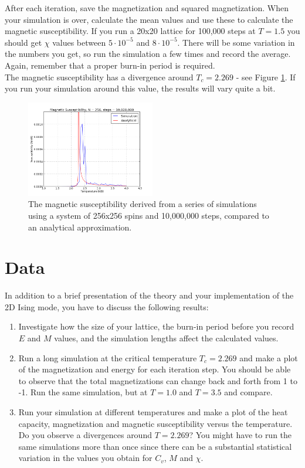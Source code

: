 \documentclass{article}
\begin{document}
After each iteration, save the magnetization and squared magnetization.
When your simulation is over, calculate the mean values and use these to calculate the magnetic susceptibility.
If you run a 20x20 lattice for 100,000 steps at $T = 1.5$ you should get $\chi$ values between $5 \cdot 10^{-5}$ and $8 \cdot 10^{-5}$.
There will be some variation in the numbers you get, so run the simulation a few times and record the average.
Again, remember that a proper burn-in period is required.\\

The magnetic susceptibility has a divergence around $T_c = 2.269$ - see Figure \ref{fig:susceptibility}.
If you run your simulation around this value, the results will vary quite a bit.

\begin{figure}[p]
  \centering
  \includegraphics[width=0.5\textwidth]{xi_anal.png}
  \caption{The magnetic susceptibility derived from a series of simulations using a
  system of 256x256 spins and 10,000,000 steps, compared to an analytical approximation.}
  \label{fig:susceptibility}
\end{figure}

\section{Data}

In addition to a brief presentation of the theory and your implementation of the 2D Ising mode,
you have to discuss the following results:

\begin{enumerate}
    \item Investigate how the size of your lattice, the burn-in period before you record $E$ and $M$ values, and the simulation lengths affect the calculated values.

    \item Run a long simulation at the critical temperature $T_c = 2.269$ and make a plot of the magnetization and energy for each iteration step.
      You should be able to observe that the total magnetizations can change back and forth from 1 to -1. Run the same simulation, but at $T= 1.0$ and $T = 3.5$ and compare.

    \item Run your simulation at different temperatures and make a plot of the heat capacity, magnetization and magnetic susceptibility versus the temperature.
    Do you observe a divergences around $T = 2.269$? You might have to run the same simulations more than once since there can be a substantial statistical variation in the values you obtain for $C_v$, $M$ and $\chi$.
\end{enumerate}


\end{document}
